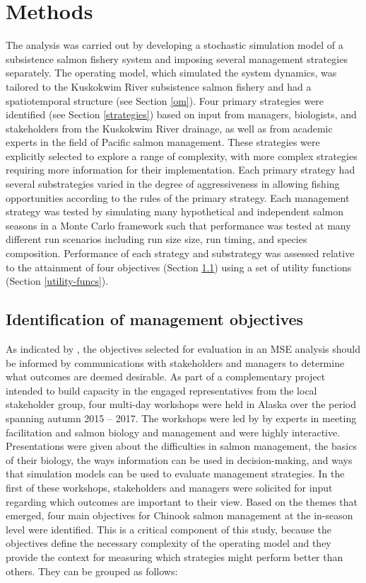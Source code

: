 \documentclass[12pt,]{book}
\theoremstyle{definition}
\theoremstyle{definition}
\theoremstyle{definition}
\theoremstyle{remark}
\begin{document}
\section{Methods}\label{methods-1}

\noindent
The analysis was carried out by developing a stochastic simulation model
of a subsistence salmon fishery system and imposing several management
strategies separately. The operating model, which simulated the system
dynamics, was tailored to the Kuskokwim River subsistence salmon fishery
and had a spatiotemporal structure (see Section \ref{om}). Four primary
strategies were identified (see Section \ref{strategies}) based on input
from managers, biologists, and stakeholders from the Kuskokwim River
drainage, as well as from academic experts in the field of Pacific
salmon management. These strategies were explicitly selected to explore
a range of complexity, with more complex strategies requiring more
information for their implementation. Each primary strategy had several
substrategies varied in the degree of aggressiveness in allowing fishing
opportunities according to the rules of the primary strategy. Each
management strategy was tested by simulating many hypothetical and
independent salmon seasons in a Monte Carlo framework such that
performance was tested at many different run scenarios including run
size size, run timing, and species composition. Performance of each
strategy and substrategy was assessed relative to the attainment of four
objectives (Section \ref{objectives}) using a set of utility functions
(Section \ref{utility-funcs}).

\subsection{Identification of management objectives}\label{objectives}

\noindent
As indicated by \citet{punt-etal-2014}, the objectives selected for
evaluation in an MSE analysis should be informed by communications with
stakeholders and managers to determine what outcomes are deemed
desirable. As part of a complementary project intended to build capacity
in the engaged representatives from the local stakeholder group, four
multi-day workshops were held in Alaska over the period spanning autumn
2015 -- 2017. The workshops were led by by experts in meeting
facilitation and salmon biology and management and were highly
interactive. Presentations were given about the difficulties in salmon
management, the basics of their biology, the ways information can be
used in decision-making, and ways that simulation models can be used to
evaluate management strategies. In the first of these workshops,
stakeholders and managers were solicited for input regarding which
outcomes are important to their view. Based on the themes that emerged,
four main objectives for Chinook salmon management at the in-season
level were identified. This is a critical component of this study,
because the objectives define the necessary complexity of the operating
model and they provide the context for measuring which strategies might
perform better than others. They can be grouped as follows:
\end{document}
